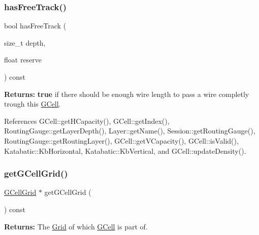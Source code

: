 \mbox{\label{classKatabatic_1_1GCell_ac2275a015db51cc12dd53fb13d22ca4f}} 
\subsubsection{\texorpdfstring{has\+Free\+Track()}{hasFreeTrack()}}
{\footnotesize\ttfamily bool has\+Free\+Track (\begin{DoxyParamCaption}\item[{size\+\_\+t}]{depth,  }\item[{float}]{reserve }\end{DoxyParamCaption}) const}

{\bfseries Returns\+:} {\bfseries true} if there should be enough wire length to pass a wire completly trough this \hyperlink{classKatabatic_1_1GCell}{G\+Cell}. 

References G\+Cell\+::get\+H\+Capacity(), G\+Cell\+::get\+Index(), Routing\+Gauge\+::get\+Layer\+Depth(), Layer\+::get\+Name(), Session\+::get\+Routing\+Gauge(), Routing\+Gauge\+::get\+Routing\+Layer(), G\+Cell\+::get\+V\+Capacity(), G\+Cell\+::is\+Valid(), Katabatic\+::\+Kb\+Horizontal, Katabatic\+::\+Kb\+Vertical, and G\+Cell\+::update\+Density().

\mbox{\label{classKatabatic_1_1GCell_a9a56286f633fddd702d66563de457a4a}} 
\subsubsection{\texorpdfstring{get\+G\+Cell\+Grid()}{getGCellGrid()}}
{\footnotesize\ttfamily \hyperlink{classKatabatic_1_1GCellGrid}{G\+Cell\+Grid} $\ast$ get\+G\+Cell\+Grid (\begin{DoxyParamCaption}{ }\end{DoxyParamCaption}) const\hspace{0.3cm}{\ttfamily [inline]}}

{\bfseries Returns\+:} The \hyperlink{classKatabatic_1_1Grid}{Grid} of which \hyperlink{classKatabatic_1_1GCell}{G\+Cell} is part of. 

